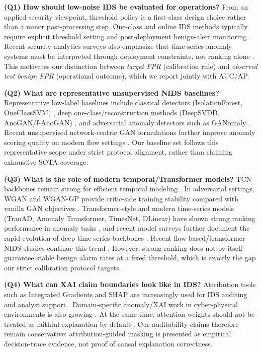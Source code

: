\textbf{(Q1) How should low-noise IDS be evaluated for operations?}
From an applied-security viewpoint, threshold policy is a first-class design choice rather than a minor post-processing step. One-class and online IDS methods typically require explicit threshold setting and post-deployment benign-alert monitoring \cite{scholkopf2001ocsvm,mirsky2018kitsune,ruff2018deep}. Recent security analytics surveys also emphasize that time-series anomaly systems must be interpreted through deployment constraints, not ranking alone \cite{landauer2025timeseriessecurity}. This motivates our distinction between \emph{target FPR} (calibration rule) and \emph{observed test benign FPR} (operational outcome), which we report jointly with AUC/AP.

\textbf{(Q2) What are representative unsupervised NIDS baselines?}
Representative low-label baselines include classical detectors (IsolationForest, OneClassSVM) \cite{liu2008iforest,scholkopf2001ocsvm}, deep one-class/reconstruction methods (DeepSVDD, AnoGAN/f-AnoGAN) \cite{ruff2018deep,schlegl2017anogan,schlegl2019fanogan}, and adversarial anomaly detectors such as GANomaly \cite{akcay2018ganomaly}. Recent unsupervised network-centric GAN formulations further improve anomaly scoring quality on modern flow settings \cite{araujo2023unsupervised,ruffo2025ganipflow}. Our baseline set follows this representative scope under strict protocol alignment, rather than claiming exhaustive SOTA coverage.

\textbf{(Q3) What is the role of modern temporal/Transformer models?}
TCN backbones remain strong for efficient temporal modeling \cite{bai2018tcn}. In adversarial settings, WGAN and WGAN-GP provide critic-side training stability compared with vanilla GAN objectives \cite{goodfellow2014gan,arjovsky2017wgan,gulrajani2017wgangp}. Transformer-style and modern time-series models (TranAD, Anomaly Transformer, TimesNet, DLinear) have shown strong ranking performance in anomaly tasks \cite{tuli2022tranad,xu2022anomalytransformer,wu2023timesnet,zeng2023dlinear}, and recent model surveys further document the rapid evolution of deep time-series backbones \cite{wang2024tssurvey}. Recent flow-based/transformer NIDS studies continue this trend \cite{manocchio2024flowtransformer,long2024transformercloud,xi2024multiscale}. However, strong ranking does not by itself guarantee stable benign alarm rates at a fixed threshold, which is exactly the gap our strict calibration protocol targets.

\textbf{(Q4) What can XAI claim boundaries look like in IDS?}
Attribution tools such as Integrated Gradients and SHAP are increasingly used for IDS auditing and analyst support \cite{sundararajan2017axiomatic,lundberg2017shap,rahman2025explaining}. Domain-specific anomaly/XAI work in cyber-physical environments is also growing \cite{aslam2024improvedaeics}. At the same time, attention weights should not be treated as faithful explanation by default \cite{jain2019attention}. Our auditability claims therefore remain conservative: attribution-guided masking is presented as empirical decision-trace evidence, not proof of causal explanation correctness.

